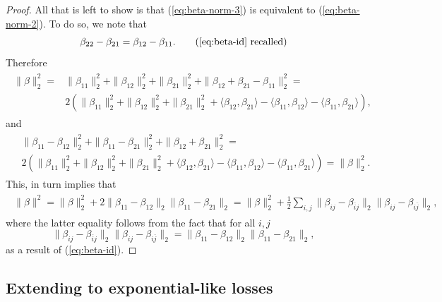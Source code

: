 \documentclass{article}
\theoremstyle{plain}
\theoremstyle{definition}
\theoremstyle{remark}
\begin{document}
\begin{proof}
All that is left to show is that (\ref{eq:beta-norm-3}) is equivalent to (\ref{eq:beta-norm-2}).
To do so, we note that
\begin{equation}
    \beta_{22}-\beta_{21}=\beta_{12}-\beta_{11}.
    \tag{\ref{eq:beta-id} recalled}
\end{equation}
Therefore
\begin{align}
    \begin{split}
        \|\beta\|_2^2=&\|\beta_{11}\|_2^2+\|\beta_{12}\|_2^2+\|\beta_{21}\|_2^2+\|\beta_{12}+\beta_{21}-\beta_{11}\|_2^2=\\
        &2(\|\beta_{11}\|_2^2+\|\beta_{12}\|_2^2+\|\beta_{21}\|_2^2+
        \langle\beta_{12},\beta_{21}\rangle-\langle\beta_{11},\beta_{12}\rangle-\langle\beta_{11},\beta_{21}\rangle
        ),
    \end{split}
\end{align}
and
\begin{align}
    \begin{split}
        &\|\beta_{11}-\beta_{12}\|_2^2+\|\beta_{11}-\beta_{21}\|_2^2+\|\beta_{12}+\beta_{21}\|_2^2=\\
        &2(\|\beta_{11}\|_2^2+\|\beta_{12}\|_2^2+\|\beta_{21}\|_2^2+
        \langle\beta_{12},\beta_{21}\rangle-\langle\beta_{11},\beta_{12}\rangle-\langle\beta_{11},\beta_{21}\rangle
        )=\|\beta\|_2^2.
    \end{split}
\end{align}
This, in turn implies that
\begin{align}
\begin{split}
        \|\beta\|^2=\|\beta\|_2^2+2\|\beta_{11}-\beta_{12}\|_2\|\beta_{11}-\beta_{21}\|_2
        =\|\beta\|_2^2+\tfrac12\sum_{i,j}\|\beta_{ij}-\beta_{\overline{i}j}\|_2\|\beta_{ij}-\beta_{i\overline{j}}\|_2,
\end{split}
\end{align}
where the latter equality follows from the fact that for all $i,j$
\begin{equation}
    \|\beta_{ij}-\beta_{\overline{i}j}\|_2\|\beta_{ij}-\beta_{i\overline{j}}\|_2=\|\beta_{11}-\beta_{12}\|_2\|\beta_{11}-\beta_{21}\|_2,
\end{equation}
as a result of (\ref{eq:beta-id}).
\end{proof}

\subsection{Extending \citet{gunasekar_characterizing_2018} to exponential-like losses}
\label{app:extension-gunasekar}
\end{document}
